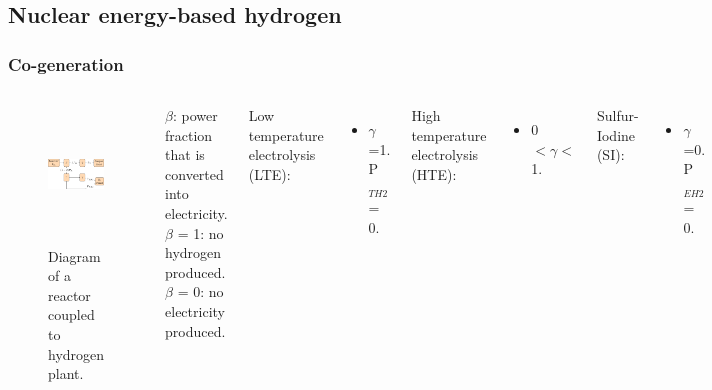 \subsection{Nuclear energy-based hydrogen}
\begin{frame}
\frametitle{Co-generation}
\begin{columns}
    \column[t]{6.8cm}
   	\begin{figure}[htbp!]
		\begin{center}
			\includegraphics[height=3.6cm]{images/hte-figure0.png}
		\end{center}
		\caption{Diagram of a reactor coupled to hydrogen plant.}
 	\end{figure}

 	\column[t]{4.5cm}
 	$\beta$: power fraction that is converted into electricity.
 	\\
    $\beta$ = 1: no hydrogen produced.
    \\
 	$\beta$ = 0: no electricity produced. \vspace{0.5cm}

 	Low temperature electrolysis (LTE):
 	\begin{itemize}
 		\item $\gamma$=1. P$_{TH2}$ = 0.
 	\end{itemize}

 	High temperature electrolysis (HTE):
 	\begin{itemize}
 		\item 0 $< \gamma <$ 1.
 	\end{itemize}

    Sulfur-Iodine (SI):
 	\begin{itemize}
 		\item $\gamma$=0. P$_{EH2}$ = 0.
 	\end{itemize}
\end{columns}
\end{frame}
